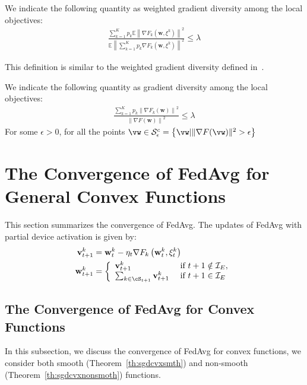\begin{definition}
	We indicate the following quantity as weighted gradient diversity among the local 
	objectives:
	\begin{align*}
		\frac{\sum_{k=1}^K p_k  \mathbb{E}\left\|\nabla F_{k}\left(\mathbf{w}, \xi^{k}\right)\right\|^{2} }{\mathbb{E}\left\| \sum_{k=1}^K p_k   \nabla F_{k}\left(\mathbf{w}, \xi^{k}\right)\right\|^{2} } \leq \lambda 
	\end{align*}
\end{definition}
This definition is similar to the weighted gradient diversity defined in~\cite{haddadpour2019convergence}.

\begin{definition}
	We indicate the following quantity as gradient diversity among the local 
	objectives:
	\begin{align*}
		\frac{\sum_{k=1}^K p_k \left\|\nabla F_{k}\left(\mathbf{w}\right)\right\|^{2} }{\left\|   \nabla F\left(\mathbf{w}\right)\right\|^{2} } \leq \lambda 
	\end{align*}
	For some $\epsilon>0$, for all the points $\vw \in \mathcal{S}_{\epsilon}^{c}=\left\{\vw |\|\nabla F(\vw)\|^{2}>\epsilon\right\}$
\end{definition}

\section{The Convergence of FedAvg for General Convex Functions}
This section summarizes the convergence of FedAvg.
The updates of FedAvg with partial device activation is given by: 
\begin{align} 
\mathbf{v}_{t+1}^{k} &=\mathbf{w}_{t}^{k}-\eta_{t} \nabla F_{k}\left(\mathbf{w}_{t}^{k}, \xi_{t}^{k}\right) \\ \mathbf{w}_{t+1}^{k} &=\left\{\begin{array}{ll}\mathbf{v}_{t+1}^{k} & \text { if } t+1 \notin \mathcal{I}_{E}, \\ 
\sum_{k \in \cS_{t+1}} \mathbf{v}_{t+1}^{k} & \text { if } t+1 \in \mathcal{I}_{E}\end{array}\right.
\end{align}

\subsection{The Convergence of FedAvg for Convex Functions}
In this subsection, we discuss the convergence of FedAvg for convex functions,
we consider both smooth (Theorem~\ref{th:sgdcvxsmth}) and non-smooth (Theorem~\ref{th:sgdcvxnonsmoth})
functions. 

